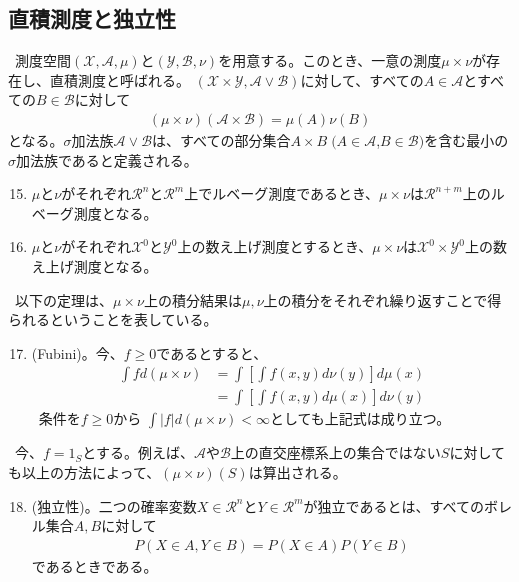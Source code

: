 \documentclass[a4j,12pt]{jarticle}
\begin{document}
\subsection{直積測度と独立性}
\ 測度空間$(\mathcal{X},\mathcal{A},\mu)$と$(\mathcal{Y},\mathcal{B},\nu)$を用意する。このとき、一意の測度$\mu × \nu$が存在し、直積測度と呼ばれる。
$(\mathcal{X}×\mathcal{Y}, \mathcal{A} \lor \mathcal{B})$に対して、すべての$A \in \mathcal{A}$とすべての$B \in \mathcal{B}$に対して
\begin{align*}
(\mu × \nu)(\mathcal{A} × \mathcal{B}) = \mu(A)\nu(B)
\end{align*}
となる。$\sigma$加法族$\mathcal{A} \lor \mathcal{B}$は、すべての部分集合$A × B \; (A \in \mathcal{A}$,$B \in \mathcal{B})$を含む最小の$\sigma$加法族であると定義される。
\begin{enumerate}[label=例1.\arabic*]
\setcounter{enumi}{14}
\item $\mu$と$\nu$がそれぞれ$\mathcal{R}^{n}$と$\mathcal{R}^{m}$上でルベーグ測度であるとき、$\mu × \nu$は$\mathcal{R}^{n+m}$上のルベーグ測度となる。
\item $\mu$と$\nu$がそれぞれ$\mathcal{X}^{0}$と$\mathcal{Y}^{0}$上の数え上げ測度とするとき、$\mu×\nu$は$\mathcal{X}^{0}×\mathcal{Y}^{0}$上の数え上げ測度となる。
\end{enumerate}
\ 以下の定理は、$\mu × \nu$上の積分結果は$\mu,\nu$上の積分をそれぞれ繰り返すことで得られるということを表している。
\begin{enumerate}[label = 定理1.\arabic*]
\setcounter{enumi}{16}
\item (Fubini)。今、$f \geq 0$であるとすると、
\begin{align*}
\int f d(\mu × \nu) &= \int \left[\int f (x,y) d\nu(y)\right]d\mu(x) \\
&=  \int \left[\int f (x,y) d\mu(x)\right]d\nu(y)
\end{align*}
\ 条件を$f \geq 0$から $\int |f|d(\mu × \nu) < \infty$としても上記式は成り立つ。　
\end{enumerate}
\ 今、$ f= 1_{S}$とする。例えば、$\mathcal{A}や\mathcal{B}$上の直交座標系上の集合ではない$S$に対しても以上の方法によって、$(\mu × \nu)(S)$は算出される。
\begin{enumerate}[label = 定義1.\arabic*]
\setcounter{enumi}{17}
\item(独立性)。二つの確率変数$X \in \mathcal{R}^{n}$と$Y \in \mathcal{R}^{m}$が独立であるとは、すべてのボレル集合$A,B$に対して
\begin{align}
\label{s}
P(X \in A , Y \in B) = P(X \in A)P(Y \in B)
\end{align}
であるときである。
\end{enumerate}
\end{document}

